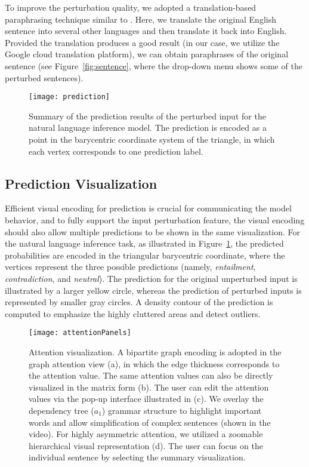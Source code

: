 To improve the perturbation quality, we adopted a translation-based paraphrasing technique similar to \citet{mallinson2017paraphrasing}. Here, we translate the original English sentence into several other languages and then translate it back into English. Provided the translation produces  a good result (in our case, we utilize the Google cloud translation platform), we can obtain paraphrases of the original sentence (see Figure~\ref{fig:sentence}, where the drop-down menu shows some of the perturbed sentences).

\begin{figure}[htbp]
\centering
\vspace{-2mm}
 \texttt{[image: prediction]}
 \caption{
Summary of the prediction results of the perturbed input for the natural language inference model.
The prediction is encoded as a point in the barycentric coordinate system of the triangle, in which each vertex corresponds to one prediction label.
}
\vspace{-3mm}
\label{fig:prediction}
\end{figure}

\subsection{Prediction Visualization}
Efficient visual encoding for prediction is crucial for communicating the model behavior, and to fully support the input perturbation feature, the visual encoding should also allow multiple predictions to be shown in the same visualization.
%
For the natural language inference task, as illustrated in Figure~\ref{fig:prediction}, the predicted probabilities are encoded in the triangular barycentric coordinate, where the vertices represent the three possible predictions (namely, \emph{entailment}, \emph{contradiction}, and \emph{neutral}). The prediction for the original unperturbed input is illustrated by a larger yellow circle, whereas the prediction of perturbed inputs is represented by smaller gray circles.
A density contour of the prediction is computed to emphasize the highly cluttered areas and detect outliers.

\begin{figure*}[t]
\centering
\vspace{-2mm}
 \texttt{[image: attentionPanels]}
  \vspace{-3mm}
 \caption{
Attention visualization. A bipartite graph encoding is adopted in the graph attention view (a), in which the edge thickness corresponds to the attention value. The same attention values can also be directly visualized in the matrix form (b).
The user can edit the attention values via the pop-up interface illustrated in (c).
We overlay the dependency tree ($a_1$) grammar structure to highlight important words and allow simplification of complex sentences (shown in the video).
%
For highly asymmetric attention, we utilized a zoomable hierarchical visual representation (d). The user can focus on the individual sentence by selecting the summary visualization.
}
\vspace{-3mm}
\label{fig:attentionVis}
\end{figure*}

